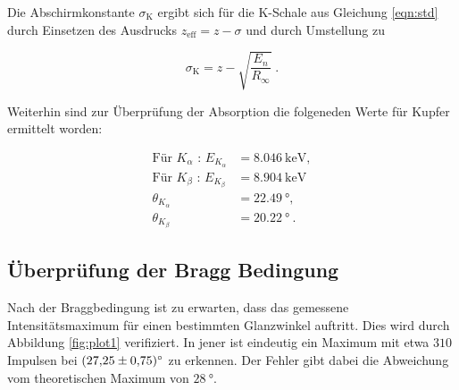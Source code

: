   Die Abschirmkonstante $\sigma_\text{K}$ ergibt sich für die K-Schale aus Gleichung
  \eqref{eqn:std} durch Einsetzen des Ausdrucks $z_\text{eff} = z -\sigma$ und durch 
  Umstellung zu 

  \begin{equation}
    \sigma_\text{K} = z - \sqrt{\frac{E_n}{R_{\infty}}} \; .
    \label{eqn:sigma}
  \end{equation}

  Weiterhin sind zur Überprüfung der Absorption die folgeneden Werte für Kupfer 
  ermittelt worden:

  \begin{align*}
    \text{Für } K_\alpha \text{ : } E_{K_\alpha} &= \SI{8.046}{\kilo\eV}, \\
    \text{Für } K_\beta \text{ : } E_{K_\beta} &= \SI{8.904}{\kilo\eV} \\
    \theta_{K_\alpha} &= \SI{22.49}{\degree}, \\
    \theta_{K_\beta} &= \SI{20.22}{\degree} \: .
 \end{align*}









\subsection{Überprüfung der Bragg Bedingung}

Nach der Braggbedingung ist zu erwarten, dass das gemessene Intensitätsmaximum
für einen bestimmten Glanzwinkel auftritt. 
Dies wird durch Abbildung \ref{fig:plot1} verifiziert. In jener ist eindeutig ein Maximum 
mit etwa $310$ Impulsen bei $\SI{27.25 +- 0.75}{\degree}$ zu erkennen. Der Fehler
gibt dabei die Abweichung vom theoretischen Maximum von $\SI{28}{\degree}$.

